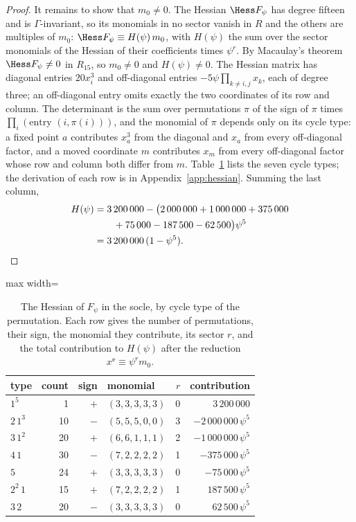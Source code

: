 \begin{proof}
It remains to show that $m_0\ne0$. The Hessian $\Hess F_\psi$ has degree
fifteen and is $\Gamma$-invariant, so its monomials in no sector vanish in
$R$ and the others are multiples of $m_0$:
$\Hess F_\psi\equiv H(\psi)\,m_0$, with $H(\psi)$ the sum over the sector
monomials of the Hessian of their coefficients times $\psi^r$. By
Macaulay's theorem $\Hess F_\psi\ne0$ in $R_{15}$, so $m_0\ne0$ and
$H(\psi)\ne0$. The Hessian matrix has diagonal entries $20x_i^3$ and
off-diagonal entries $-5\psi\prod_{k\ne i,j}x_k$, each of degree three; an
off-diagonal entry omits exactly the two coordinates of its row and column.
The determinant is the sum over permutations $\pi$ of the sign of $\pi$
times $\prod_i(\text{entry }(i,\pi(i)))$, and the monomial of $\pi$ depends
only on its cycle type: a fixed point $a$ contributes $x_a^3$ from the
diagonal and $x_a$ from every off-diagonal factor, and a moved coordinate
$m$ contributes $x_m$ from every off-diagonal factor whose row and column
both differ from $m$. Table~\ref{tab:hessian} lists the seven cycle types;
the derivation of each row is in Appendix~\ref{app:hessian}. Summing the
last column,
\begin{align*}
H(\psi)&=3\,200\,000-\big(2\,000\,000+1\,000\,000+375\,000\\
&\qquad+75\,000-187\,500-62\,500\big)\psi^5\\
&=3\,200\,000\,(1-\psi^5). \qedhere
\end{align*}
\end{proof}

\begin{table}[t]
\caption{The Hessian of $F_\psi$ in the socle, by cycle type of the
permutation. Each row gives the number of permutations, their sign, the
monomial they contribute, its sector $r$, and the total contribution to
$H(\psi)$ after the reduction $x^{\ee}\equiv\psi^rm_0$.}
\label{tab:hessian}
\centering
\begin{adjustbox}{max width=\linewidth}\begin{tabular}{lrrlrr}
\toprule
type & count & sign & monomial & $r$ & contribution\\
\midrule
$1^5$ & 1 & $+$ & $(3,3,3,3,3)$ & 0 & $3\,200\,000$\\
$2\,1^3$ & 10 & $-$ & $(5,5,5,0,0)$ & 3 & $-2\,000\,000\,\psi^5$\\
$3\,1^2$ & 20 & $+$ & $(6,6,1,1,1)$ & 2 & $-1\,000\,000\,\psi^5$\\
$4\,1$ & 30 & $-$ & $(7,2,2,2,2)$ & 1 & $-375\,000\,\psi^5$\\
$5$ & 24 & $+$ & $(3,3,3,3,3)$ & 0 & $-75\,000\,\psi^5$\\
$2^2\,1$ & 15 & $+$ & $(7,2,2,2,2)$ & 1 & $187\,500\,\psi^5$\\
$3\,2$ & 20 & $-$ & $(3,3,3,3,3)$ & 0 & $62\,500\,\psi^5$\\
\bottomrule
\end{tabular}\end{adjustbox}
\end{table}

